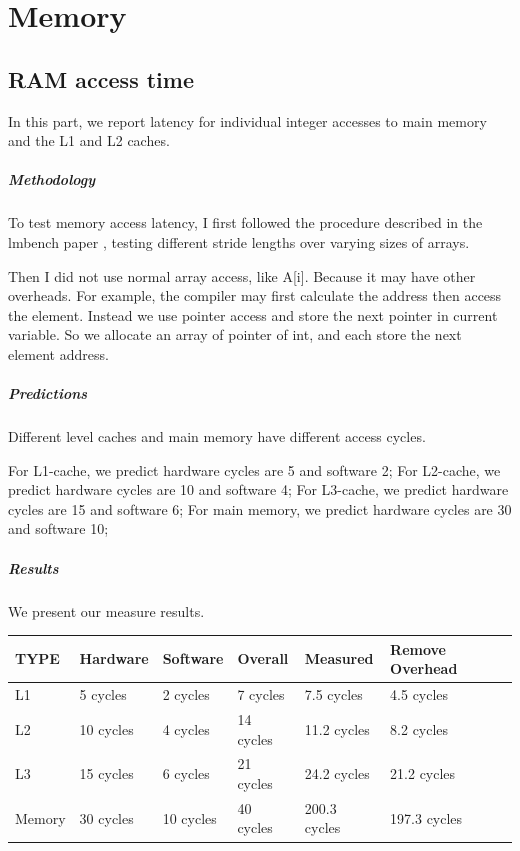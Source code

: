 \chapter{Memory}

\section{RAM access time}
In this part, we report latency for individual integer accesses to main memory and the L1 and L2 caches.

\paragraph{Methodology}
To test memory access latency, I first followed the procedure described in the lmbench paper \cite{ramacc}, testing different stride lengths over varying sizes of arrays. 

Then I did not use normal array access, like A[i]. Because it may have other overheads. For example, the compiler may first calculate the address then access the element. Instead we use pointer access and store the next pointer in current variable. So we allocate an array of pointer of int, and each store the next element address.

\paragraph{Predictions}
Different level caches and main memory have different access cycles.

For L1-cache, we predict hardware cycles are 5 and software 2;
For L2-cache, we predict hardware cycles are 10 and software 4;
For L3-cache, we predict hardware cycles are 15 and software 6;
For main memory, we predict hardware cycles are 30 and software 10;

\paragraph{Results}
We present our measure results.

\begin{center}
\begin{tabular}{| p{1.5cm} | p{2cm} | p{2cm} | p{2cm} | p{2.5cm} | p{3cm} |}
TYPE             & Hardware  & Software  & Overall  & Measured  & Remove Overhead \\
\hline

L1	&   5 cycles  & 2 cycles & 7 cycles  &  7.5  cycles &  4.5 cycles \\
L2    &   10 cycles & 4 cycles & 14 cycles & 11.2 cycles &  8.2 cycles \\
L3 	&   15 cycles & 6 cycles & 21 cycles &  24.2 cycles & 21.2 cycles \\
Memory & 30 cycles & 10 cycles & 40 cycles & 200.3 cycles & 197.3 cycles \\
\end{tabular}
\end{center}


